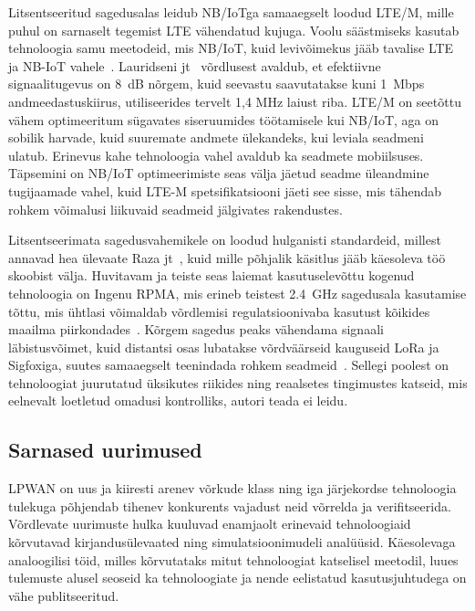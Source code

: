 \documentclass[12pt]{article}
\begin{document}
    Litsentseeritud sagedusalas leidub NB\-/IoTga samaaegselt loodud LTE\-/M, mille puhul on sarnaselt tegemist LTE vähendatud kujuga.
    Voolu säästmiseks kasutab tehnoloogia samu meetodeid, mis NB\-/IoT, kuid levivõimekus jääb tavalise LTE ja NB-IoT vahele~\cite{benhiba2018comparative}.
    Lauridseni jt~\cite{lauridsen2016coverage} võrdlusest avaldub, et efektiivne signaalitugevus on 8~dB nõrgem, kuid seevastu saavutatakse kuni 1~Mbps andmeedastuskiirus, utiliseerides tervelt 1,4 MHz laiust riba.
    LTE\-/M on seetõttu vähem optimeeritum sügavates siseruumides töötamisele kui NB\-/IoT, aga on sobilik harvade, kuid suuremate andmete ülekandeks, kui leviala seadmeni ulatub.
    Erinevus kahe tehnoloogia vahel avaldub ka seadmete mobiilsuses.
    Täpsemini on NB\-/IoT optimeerimiste seas välja jäetud seadme üleandmine tugijaamade vahel, kuid LTE-M spetsifikatsiooni jäeti see sisse, mis tähendab rohkem võimalusi liikuvaid seadmeid jälgivates rakendustes.

    Litsentseerimata sagedusvahemikele on loodud hulganisti standardeid, millest annavad hea ülevaate Raza jt~\cite{raza}, kuid mille põhjalik käsitlus jääb käesoleva töö skoobist välja.
    Huvitavam ja teiste seas laiemat kasutuselevõttu kogenud tehnoloogia on Ingenu RPMA, mis erineb teistest \SI{2.4}{\giga\hertz} sagedusala kasutamise tõttu, mis ühtlasi võimaldab võrdlemisi regulatsioonivaba kasutust kõikides maailma piirkondades~\cite{queralta2019comparative}.
    Kõrgem sagedus peaks vähendama signaali läbistusvõimet, kuid distantsi osas lubatakse võrdväärseid kauguseid LoRa ja Sigfoxiga, suutes samaaegselt teenindada rohkem seadmeid~\cite{raza}.
    Sellegi poolest on tehnoloogiat juurutatud üksikutes riikides ning reaalsetes tingimustes katseid, mis eelnevalt loetletud omadusi kontrolliks, autori teada ei leidu.

    \begin{tabularx}

    \end{tabularx}

    \subsection{Sarnased uurimused}
    LPWAN on uus ja kiiresti arenev võrkude klass ning iga järjekordse tehnoloogia tulekuga põhjendab tihenev konkurents vajadust neid võrrelda ja verifitseerida.
    Võrdlevate uurimuste hulka kuuluvad enamjaolt erinevaid tehnoloogiaid kõrvutavad kirjandusülevaated ning simulatsioonimudeli analüüsid.
    Käesolevaga analoogilisi töid, milles kõrvutataks mitut tehnoloogiat katselisel meetodil, luues tulemuste alusel seoseid ka tehnoloogiate ja nende eelistatud kasutusjuhtudega on vähe publitseeritud.
\end{document}
